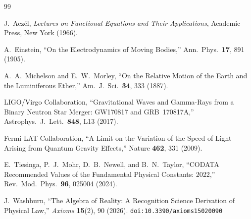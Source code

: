 \documentclass[12pt,a4paper]{article}
\theoremstyle{definition}
\theoremstyle{remark}
\begin{document}
\begin{thebibliography}{99}

J.~Acz\'el, \emph{Lectures on Functional Equations and Their Applications},
Academic Press, New York (1966).

A.~Einstein, ``On the Electrodynamics of Moving Bodies,'' Ann.\
Phys.\ \textbf{17}, 891 (1905).

A.~A.~Michelson and E.~W.~Morley, ``On the Relative Motion of the
Earth and the Luminiferous Ether,'' Am.\ J.\ Sci.\
\textbf{34}, 333 (1887).

LIGO/Virgo Collaboration, ``Gravitational Waves and Gamma-Rays from
a Binary Neutron Star Merger: GW170817 and GRB~170817A,''
Astrophys.\ J.\ Lett.\ \textbf{848}, L13 (2017).

Fermi LAT Collaboration, ``A Limit on the Variation of the Speed of
Light Arising from Quantum Gravity Effects,'' Nature \textbf{462},
331 (2009).

E.~Tiesinga, P.~J.~Mohr, D.~B.~Newell, and B.~N.~Taylor,
``CODATA Recommended Values of the Fundamental Physical
Constants: 2022,'' Rev.\ Mod.\ Phys.\ \textbf{96}, 025004 (2024).

\bibitem{RS_Axioms}
J.~Washburn, ``The Algebra of Reality: A Recognition Science Derivation
of Physical Law,'' \emph{Axioms} \textbf{15}(2), 90 (2026).
\texttt{doi:10.3390/axioms15020090}

\end{thebibliography}
\end{document}
